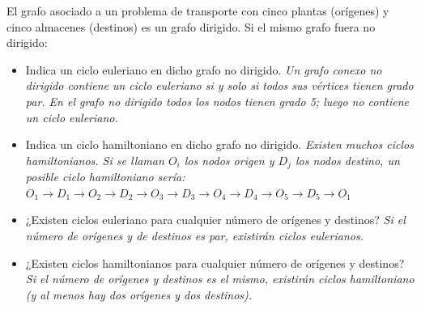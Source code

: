 El grafo asociado a un problema de transporte con cinco plantas (orígenes) y cinco almacenes (destinos) es un grafo dirigido. Si el mismo grafo fuera no dirigido:
\begin{itemize}
    \item Indica un ciclo euleriano en dicho grafo no dirigido. \textit{Un grafo conexo no dirigido contiene un ciclo euleriano si y solo si todos sus vértices tienen grado par. En el grafo no dirigido todos los nodos tienen grado 5; luego   no contiene un ciclo euleriano.}
    \item Indica un ciclo hamiltoniano en dicho grafo no dirigido.  \textit{Existen  muchos ciclos hamiltonianos. Si se llaman $O_i$ los nodos origen y $D_j$ los nodos destino, un posible ciclo hamiltoniano sería: $O_1 \rightarrow D_1 \rightarrow O_2 \rightarrow D_2 \rightarrow O_3 \rightarrow D_3 \rightarrow O_4 \rightarrow D_4 \rightarrow O_5 \rightarrow D_5 \rightarrow O_1$}
    \item ¿Existen ciclos euleriano para cualquier número de orígenes y destinos? \textit{Si el número de orígenes y de destinos es par, existirán ciclos eulerianos.} 
    \item ¿Existen ciclos hamiltonianos para cualquier número de orígenes y destinos? \textit{Si el número de orígenes y destinos es el mismo, existirán ciclos hamiltoniano  (y al menos hay dos orígenes y dos destinos).}


\end{itemize}

